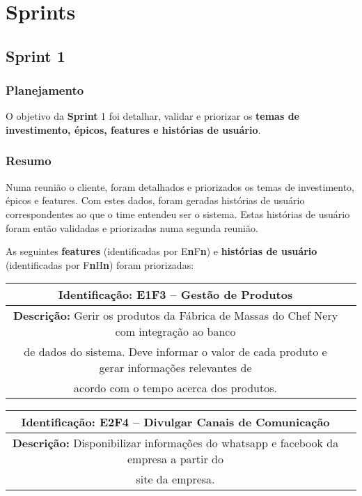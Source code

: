 
\chapter[Sprints]{Sprints}


\section{\large{Sprint 1}}

\subsection{Planejamento}
    O objetivo da \textbf{Sprint} 1 foi detalhar, validar e priorizar os \textbf{temas de investimento, épicos, features e histórias de usuário}.

\subsection{Resumo}
    Numa reunião o cliente, foram detalhados e priorizados os temas de investimento, épicos e features. Com estes dados, foram geradas histórias de usuário correspondentes ao que o time entendeu ser o sistema. Estas histórias de usuário foram então validadas e priorizadas numa segunda reunião.

    As seguintes \textbf{features} (identificadas por E\textbf{n}F\textbf{n}) e \textbf{histórias de usuário} (identificadas por F\textbf{n}H\textbf{n}) foram priorizadas:

    \begin{table}[H]
    \centering
    \begin{tabular}{c|p{10cm}}
    \hline
    \textbf{Identificação:} E1F3 – Gestão de Produtos \\
    \hline
    \textbf{Descrição:} Gerir os produtos da Fábrica de Massas do Chef Nery com integração ao banco\\
     de dados do sistema. Deve informar o valor de cada produto e gerar informações relevantes de \\
     acordo com o tempo acerca dos produtos.    \\
    \hline
    \end{tabular}
    \end{table}

    \begin{table}[H]
    \centering
    \begin{tabular}{c|p{10cm}}
    \hline
    \textbf{Identificação:} E2F4 – Divulgar Canais de Comunicação \\
    \hline
    \textbf{Descrição:} Disponibilizar informações do whatsapp e facebook da empresa a partir do \\
    site da empresa.\\
    \hline
    \end{tabular}
    \end{table}

